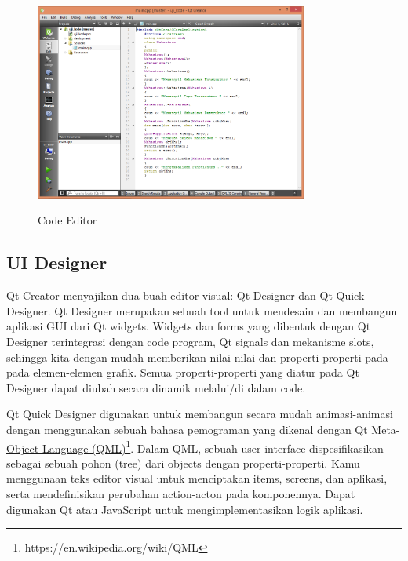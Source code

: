 \begin{figure}[htbp]
\centering
\includegraphics[width=0.8\textwidth]{images/capture1-2.png}
\label{code-editor}
\caption{ Code Editor}
\end{figure}

\subsection{UI Designer}\label{ui-designer}

Qt Creator menyajikan dua buah editor visual: Qt Designer  dan Qt Quick
Designer. Qt Designer merupakan sebuah tool untuk mendesain dan
membangun aplikasi GUI dari Qt widgets. Widgets dan forms yang dibentuk
dengan Qt Designer terintegrasi dengan code program, Qt signals dan
mekanisme slots, sehingga kita dengan mudah memberikan nilai-nilai dan
properti-properti pada pada elemen-elemen grafik. Semua
properti-properti yang diatur pada Qt Designer dapat diubah secara
dinamik melalui/di dalam code.

Qt Quick Designer digunakan untuk membangun secara mudah animasi-animasi
dengan menggunakan sebuah bahasa pemograman yang dikenal dengan
\href{https://en.wikipedia.org/wiki/QML}{Qt Meta-Object Language (QML)}\footnote{https://en.wikipedia.org/wiki/QML}.
Dalam QML, sebuah user interface dispesifikasikan sebagai sebuah pohon
(tree) dari objects dengan properti-properti. Kamu menggunaan teks
editor visual untuk menciptakan items, screens, dan aplikasi, serta
mendefinisikan perubahan action-acton pada komponennya. Dapat digunakan
Qt atau JavaScript untuk mengimplementasikan logik aplikasi.

